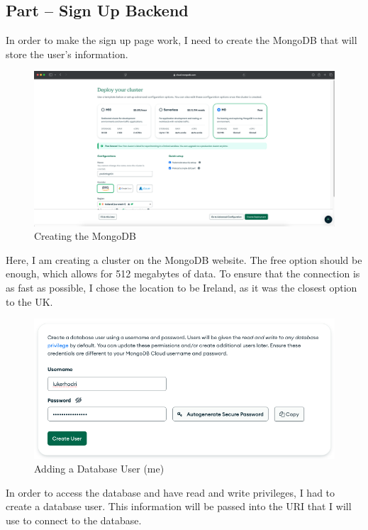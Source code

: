 \documentclass[12pt]{report}
\begin{document}
\subsection{Part \theparts{} -- Sign Up Backend}

In order to make the sign up page work, I need to create the MongoDB that will store the user's information.

\begin{figure}[H]
\centering
\includegraphics[width=14cm]{ss15.1.png}
\caption{Creating the MongoDB}\label{fig:ss15.1}
\end{figure}

Here, I am creating a cluster on the MongoDB website. The free option should be enough, which allows for 512 megabytes of data. To ensure that the connection is as fast as possible, I chose the location to be Ireland, as it was the closest option to the UK.

\begin{figure}[H]
\centering
\includegraphics[width=12cm]{ss15.2.png}
\caption{Adding a Database User (me)}\label{fig:ss15.2}
\end{figure}

In order to access the database and have read and write privileges, I had to create a database user. This information will be passed into the URI that I will use to connect to the database.
\end{document}
